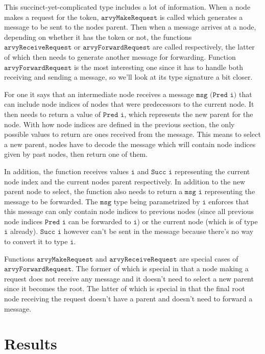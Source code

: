 \documentclass[a4paper, oneside]{discothesis}
\begin{document}
This succinct-yet-complicated type includes a lot of information. When a node makes a request for the token, $\texttt{arvyMakeRequest}$ is called which generates a message to be sent to the nodes parent. Then when a message arrives at a node, depending on whether it has the token or not, the functions $\texttt{arvyReceiveRequest}$ or $\texttt{arvyForwardRequest}$ are called respectively, the latter of which then needs to generate another message for forwarding. Function $\texttt{arvyForwardRequest}$ is the most interesting one since it has to handle both receiving and sending a message, so we'll look at its type signature a bit closer.

For one it says that an intermediate node receives a message $\texttt{msg (Pred i)}$ that can include node indices of nodes that were predecessors to the current node. It then needs to return a value of $\texttt{Pred i}$, which represents the new parent for the node. With how node indices are defined in the previous section, the only possible values to return are ones received from the message. This means to select a new parent, nodes have to decode the message which will contain node indices given by past nodes, then return one of them.

In addition, the function receives values $\texttt{i}$ and $\texttt{Succ i}$ representing the current node index and the current nodes parent respectively. In addition to the new parent node to select, the function also needs to return a $\texttt{msg i}$ representing the message to be forwarded. The $\texttt{msg}$ type being parametrized by $\texttt{i}$ enforces that this message can only contain node indices to previous nodes (since all previous node indices $\texttt{Pred i}$ can be forwarded to $\texttt{i}$) or the current node (which is of type $\texttt{i}$ already). $\texttt{Succ i}$ however can't be sent in the message because there's no way to convert it to type $\texttt{i}$.

Functions $\texttt{arvyMakeRequest}$ and $\texttt{arvyReceiveRequest}$ are special cases of $\texttt{arvyForwardRequest}$. The former of which is special in that a node making a request does not receive any message and it doesn't need to select a new parent since it becomes the root. The latter of which is special in that the final root node receiving the request doesn't have a parent and doesn't need to forward a message.

\chapter{Results}
\end{document}
